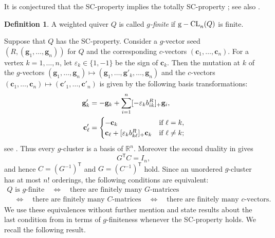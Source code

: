 \documentclass[11pt,reqno]{amsart}
\numberwithin{equation}{section}
\theoremstyle{definition}
\newtheorem{definition}[example]{Definition}
\theoremstyle{plain}
\DeclareMathOperator{\gseed}{{\rm g-CL}}
\begin{document}
	It is conjectured that the SC-property implies the totally SC-property
	\cite[Conjecture~5.1]{AC25}; see also \cite[Section~8]{Re14}.
	
	\begin{definition}\label{def:gfinite}
		A weighted quiver $Q$ is called \emph{$g$-finite} if $\gseed_n(Q)$ is finite.
	\end{definition}
	
	Suppose that $Q$ has the SC-property. Consider a $g$-vector seed $(R,(\mathbf{g}_1,\dots,\mathbf{g}_n))$ for $Q$ and the corresponding $c$-vectors $(\mathbf{c}_1,\dots,\mathbf{c}_n)$. For a vertex $k=1,\dots,n$, let $\varepsilon_k \in \{1,-1\}$ be the sign of $\mathbf{c}_{k}$. Then the mutation at $k$ of the $g$-vectors $(\mathbf{g}_1,\dots,\mathbf{g}_n) \mapsto (\mathbf{g}_1,\dots,\mathbf{g}'_k,\dots,\mathbf{g}_n)$ and the $c$-vectors $(\mathbf{c}_1,\dots,\mathbf{c}_n) \mapsto (\mathbf{c}'_1,\dots,\mathbf{c}'_n)$ is given by the following basis transformations:
  \begin{align}
    \mathbf{g}'_{k} &= -\mathbf{g}_k + \sum_{i=1}^n[-\varepsilon_k b_{ik}^R]_+\mathbf g_i, \label{eq:g-signed-mutation}
    \\
    \mathbf{c}'_{\ell} &= \begin{cases}
      -\mathbf{c}_k & \textup{if $\ell = k$},
      \\
      \mathbf{c}_{\ell} + [\varepsilon_k b_{k\ell}^R]_+\mathbf{c}_{k} & \textup{if $\ell \neq k$};
    \end{cases}
  \end{align}
  see \cite{AC25}. Thus every $g$-cluster is a basis of $\mathbb R^n$.
  Moreover the second duality in \cite[Proposition~4.8]{AC25} gives \begin{equation}\label{eq:GC-duality}
		G^{\mathsf T}C=I_n,
	\end{equation}
	and hence $C=(G^{-1})^{\mathsf T}$ and $G = (C^{-1})^{\mathsf T}$ hold. Since an unordered $g$-cluster has at most $n!$ orderings, the following conditions are equivalent:
	\begin{equation}\label{eq:equivalenceofcgfinite}
    \begin{gathered}
    Q\text{ is $g$-finite}
    \quad\Longleftrightarrow\quad
    \text{there are finitely many $G$-matrices}\\
    \quad\Longleftrightarrow\quad
    \text{there are finitely many $C$-matrices}
    \quad\Longleftrightarrow\quad
    \text{there are finitely many $c$-vectors}.
    \end{gathered}
  \end{equation}
	We use these equivalences without further mention and state results about the last condition from \cite{AC25} in terms of $g$-finiteness whenever the SC-property holds. We recall the following result.
	
\end{document}
